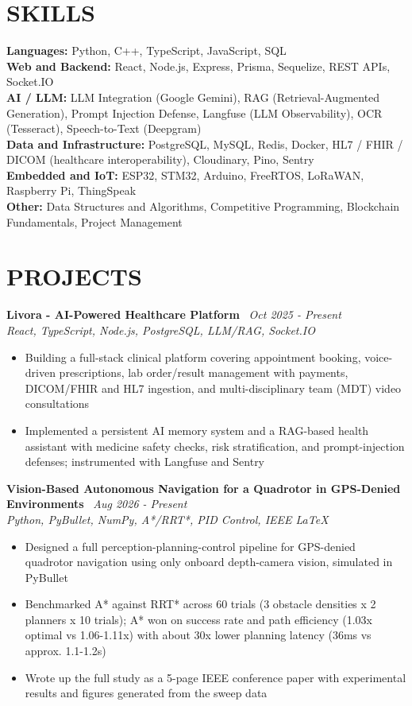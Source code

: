 \documentclass[10.5pt,a4paper]{article}
\newenvironment{tightitemize}{
  \begin{itemize}[leftmargin=15pt, itemsep=0pt, parsep=0pt, topsep=1pt]
}{
  \end{itemize}
}
\newcommand{\entrysimple}[2]{%
  \textbf{#1} \textbar\ \textit{#2}\\[1pt]
}
\begin{document}
\section*{SKILLS}
\textbf{Languages:} Python, C++, TypeScript, JavaScript, SQL\\[2pt]
\textbf{Web and Backend:} React, Node.js, Express, Prisma, Sequelize, REST APIs, Socket.IO\\[2pt]
\textbf{AI / LLM:} LLM Integration (Google Gemini), RAG (Retrieval-Augmented Generation), Prompt Injection Defense, Langfuse (LLM Observability), OCR (Tesseract), Speech-to-Text (Deepgram)\\[2pt]
\textbf{Data and Infrastructure:} PostgreSQL, MySQL, Redis, Docker, HL7 / FHIR / DICOM (healthcare interoperability), Cloudinary, Pino, Sentry\\[2pt]
\textbf{Embedded and IoT:} ESP32, STM32, Arduino, FreeRTOS, LoRaWAN, Raspberry Pi, ThingSpeak\\[2pt]
\textbf{Other:} Data Structures and Algorithms, Competitive Programming, Blockchain Fundamentals, Project Management

\section*{PROJECTS}

\entrysimple{Livora - AI-Powered Healthcare Platform}{Oct 2025 - Present}
\textit{React, TypeScript, Node.js, PostgreSQL, LLM/RAG, Socket.IO}
\begin{tightitemize}
  \item Building a full-stack clinical platform covering appointment booking, voice-driven prescriptions, lab order/result management with payments, DICOM/FHIR and HL7 ingestion, and multi-disciplinary team (MDT) video consultations
  \item Implemented a persistent AI memory system and a RAG-based health assistant with medicine safety checks, risk stratification, and prompt-injection defenses; instrumented with Langfuse and Sentry
\end{tightitemize}

\entrysimple{Vision-Based Autonomous Navigation for a Quadrotor in GPS-Denied Environments}{Aug 2026 - Present}
\textit{Python, PyBullet, NumPy, A*/RRT*, PID Control, IEEE LaTeX}
\begin{tightitemize}
  \item Designed a full perception-planning-control pipeline for GPS-denied quadrotor navigation using only onboard depth-camera vision, simulated in PyBullet
  \item Benchmarked A* against RRT* across 60 trials (3 obstacle densities x 2 planners x 10 trials); A* won on success rate and path efficiency (1.03x optimal vs 1.06-1.11x) with about 30x lower planning latency (36ms vs approx. 1.1-1.2s)
  \item Wrote up the full study as a 5-page IEEE conference paper with experimental results and figures generated from the sweep data
\end{tightitemize}
\end{document}
